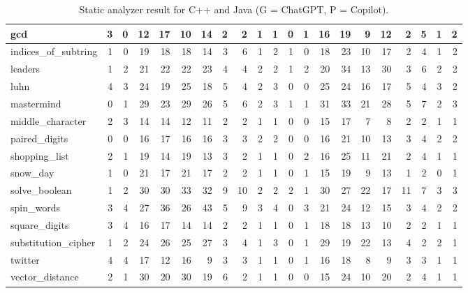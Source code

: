 \begin{table}[!h]
{\begin{tabular}{|l|rr|rr|rr|rr|rr|rr|rr|rr|rr|rr|}
		gcd                   &   3 &   0 &  12 &  17 &  10 &  14 &   2 &   2 &   1 &   1 & 0 & 1 & 16 & 19 &  9 & 12 & 2 & 5 & 1 & 2 \\ \hline
		indices\_of\_subtring &   1 &   0 &  19 &  18 &  18 &  14 &   3 &   6 &   1 &   2 & 1 & 0 & 18 & 23 & 10 & 17 & 2 & 4 & 1 & 2 \\ \hline
		leaders               &   1 &   2 &  21 &  22 &  22 &  23 &   4 &   4 &   2 &   2 & 1 & 2 & 20 & 34 & 13 & 30 & 3 & 6 & 2 & 2 \\ \hline
		luhn                  &   4 &   3 &  24 &  19 &  25 &  18 &   5 &   4 &   2 &   3 & 0 & 0 & 25 & 24 & 16 & 17 & 5 & 4 & 3 & 2 \\ \hline
		mastermind            &   0 &   1 &  29 &  23 &  29 &  26 &   5 &   6 &   2 &   3 & 1 & 1 & 31 & 33 & 21 & 28 & 5 & 7 & 2 & 3 \\ \hline
		middle\_character     &   2 &   3 &  14 &  14 &  12 &  11 &   2 &   2 &   1 &   1 & 0 & 0 & 15 & 17 &  7 & 8  & 2 & 2 & 1 & 1 \\ \hline
		paired\_digits        &   0 &   0 &  16 &  17 &  16 &  16 &   3 &   3 &   2 &   2 & 0 & 0 & 16 & 21 & 10 & 13 & 3 & 4 & 2 & 2 \\ \hline
		shopping\_list        &   2 &   1 &  19 &  14 &  19 &  13 &   3 &   2 &   1 &   1 & 0 & 2 & 16 & 25 & 11 & 21 & 2 & 4 & 1 & 1 \\ \hline
		snow\_day             &   1 &   0 &  21 &  17 &  21 &  17 &   2 &   2 &   1 &   1 & 0 & 1 & 15 & 19 &  9 & 13 & 1 & 2 & 0 & 1 \\ \hline
		solve\_boolean        &   1 &   2 &  30 &  30 &  33 &  32 &   9 &  10 &   2 &   2 & 2 & 1 & 30 & 27 & 22 & 17 & 11& 7 & 3 & 3 \\ \hline
		spin\_words           &   3 &   4 &  27 &  36 &  26 &  43 &   5 &   9 &   3 &   4 & 0 & 3 & 21 & 24 & 12 & 15 & 3 & 4 & 2 & 2 \\ \hline
		square\_digits        &   3 &   4 &  16 &  17 &  14 &  14 &   2 &   2 &   1 &   1 & 0 & 1 & 18 & 18 & 13 & 10 & 2 & 2 & 1 & 1 \\ \hline
		substitution\_cipher  &   1 &   2 &  24 &  26 &  25 &  27 &   3 &   4 &   1 &   3 & 0 & 1 & 29 & 19 & 22 & 13 & 4 & 2 & 2 & 1 \\ \hline
		twitter               &   4 &   4 &  17 &  12 &  16 &   9 &   3 &   3 &   1 &   1 & 0 & 1 & 16 & 18 &  8 & 9  & 3 & 3 & 1 & 1 \\ \hline
		vector\_distance      &   2 &   1 &  30 &  20 &  30 &  19 &   6 &   2 &   1 &   1 & 0 & 0 & 15 & 24 & 10 & 20 & 2 & 4 & 1 & 1 \\ \hline
		
	\end{tabular}
}
	\vspace{2px}
	\caption{Static analyzer result for C++ and Java (G = ChatGPT, P = Copilot).}
	\label{t:static_analyzers}
	\vspace{-25px}
\end{table}

